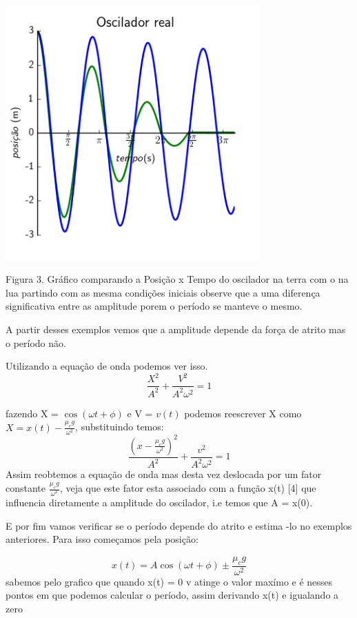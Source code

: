 \documentclass[a4paper]{article} %
\begin{document}
\begin{center}
 	\includegraphics[width=3.84in,height=3.84in,keepaspectratio = false]{image_c0.png}
 	
 	\scriptsize Figura 3. Gr\'afico comparando a Posi\c{c}\~ao x Tempo do oscilador na terra com o na lua partindo com as mesma condi\c{c}\~oes iniciais observe que a uma diferen\c{c}a significativa entre as amplitude porem o per\'iodo se manteve o mesmo.
 	
\end{center}

A partir desses exemplos vemos que a amplitude depende da for\c{c}a de atrito mas o per\'iodo não.

Utilizando a equa\c{c}\~ao de onda podemos ver isso.
\[\frac{X^2}{A^2} + \frac{V^2}{A^2\omega^2} = 1\]

fazendo X = $\cos(\omega{t}+\phi)$ e V = $v(t)$ podemos reescrever X como $X = x(t) - \frac{\mu_cg}{\omega^2}$, substituindo temos:
\[\frac{\left(x- \frac{\mu_cg}{\omega^2}\right)^2}{A^2} + \frac{v^2}{A^2\omega^2} = 1\]
Assim reobtemos a equa\c{c}\~ao de onda mas desta vez deslocada por um fator constante $\frac{\mu_cg}{\omega^2}$, veja que este fator esta associado com a fun\c{c}\~ao x(t) [4] que influencia diretamente a amplitude do oscilador, i.e temos que A = x(0).

E por fim vamos verificar se o per\'iodo depende do atrito e estima -lo no exemplos anteriores. Para isso come\c{c}amos pela posi\c{c}\~ao:

\[x(t) = A\cos(\omega{t} + \phi) \pm \frac{\mu_cg}{\omega^2}\]
sabemos pelo grafico que quando x(t) = 0 v atinge o valor max\'imo e \'e nesses pontos em que podemos calcular o per\'iodo, assim derivando x(t) e igualando a zero
\end{document}
